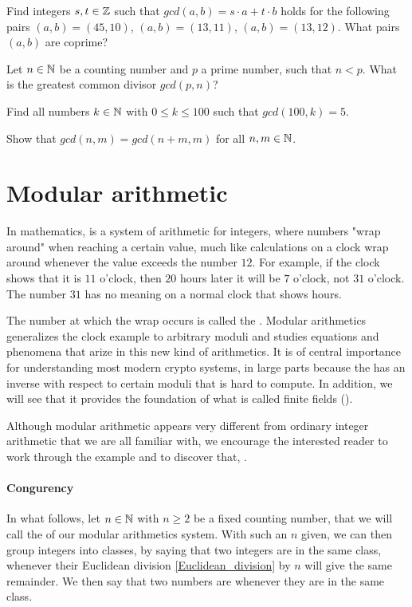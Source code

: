\begin{exercise}
Find integers $s,t\in\mathbb{Z}$ such that $gcd(a,b)= s\cdot a +t\cdot b$ holds for the following pairs $(a,b) = (45,10)$, $(a,b)=(13,11)$, $(a,b)=(13,12)$. What pairs $(a,b)$ are coprime?
\end{exercise}
\begin{exercise}
Let $n\in \mathbb{N}$ be a counting number and $p$ a prime number, such that $n<p$. What is the greatest common divisor $gcd(p,n)$?
\end{exercise}
\begin{exercise}
Find all numbers $k\in\mathbb{N}$ with $0\leq k \leq 100$ such that $gcd(100,k) = 5$.
\end{exercise}
\begin{exercise}
Show that $gcd(n,m) = gcd(n+m,m)$ for all $n,m\in\mathbb{N}$.
\end{exercise}
\section{Modular arithmetic}
In mathematics,  is a system of arithmetic for integers, where numbers "wrap around" when reaching a certain value, much like calculations on a clock wrap around whenever the value exceeds the number $12$. For example, if the clock shows that it is $11$ o'clock, then $20$ hours later it will be $7$ o'clock, not $31$ o'clock. The number $31$ has no meaning on a normal clock that shows hours. 

The number at which the wrap occurs is called the . Modular arithmetics generalizes the clock example to arbitrary moduli and studies equations and phenomena that arize in this new kind of arithmetics. It is of central importance for understanding most modern crypto systems, in large parts because the  has an inverse with respect to certain moduli that is hard to compute. In addition, we will see that it provides the foundation of what is called finite fields ().

Although modular arithmetic appears very different from ordinary integer arithmetic that we are all familiar with, we encourage the interested reader to work through the example and to discover that, .
\paragraph{Congurency}
In what follows, let $n\in\mathbb{N}$ with $n\geq 2$ be a fixed counting number, that we will call the  of our modular arithmetics system. With such an $n$ given, we can then group integers into classes, by saying that two integers are in the same class, whenever their Euclidean division \ref{Euclidean_division} by $n$ will give the same remainder. We then say that two numbers are  whenever they are in the same class.

